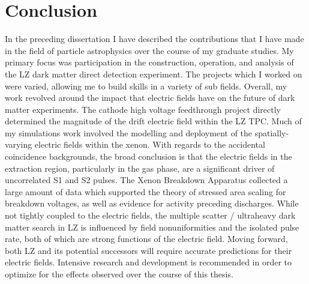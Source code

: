 \chapter{Conclusion}
\label{chap:conclusion}

In the preceding dissertation I have described the contributions that I have made in the field of particle astrophysics over the course of my graduate studies.
My primary focus was participation in the construction, operation, and analysis of the LZ dark matter direct detection experiment.
The projects which I worked on were varied, allowing me to build skills in a variety of sub fields.
Overall, my work revolved around the impact that electric fields have on the future of dark matter experiments.
The cathode high voltage feedthrough project directly determined the magnitude of the drift electric field within the LZ TPC.
Much of my simulations work involved the modelling and deployment of the spatially-varying electric fields within the xenon.
With regards to the accidental coincidence backgrounds, the broad conclusion is that the electric fields in the extraction region, particularly in the gas phase, are a significant driver of uncorrelated S1 and S2 pulses.
The Xenon Breakdown Apparatus collected a large amount of data which supported the theory of stressed area scaling for breakdown voltages, as well as evidence for activity preceding discharges.
While not tightly coupled to the electric fields, the multiple scatter / ultraheavy dark matter search in LZ is influenced by field nonuniformities and the isolated pulse rate, both of which are strong functions of the electric field.
Moving forward, both LZ and its potential successors will require accurate predictions for their electric fields. 
Intensive research and development is recommended in order to optimize for the effects observed over the course of this thesis.
